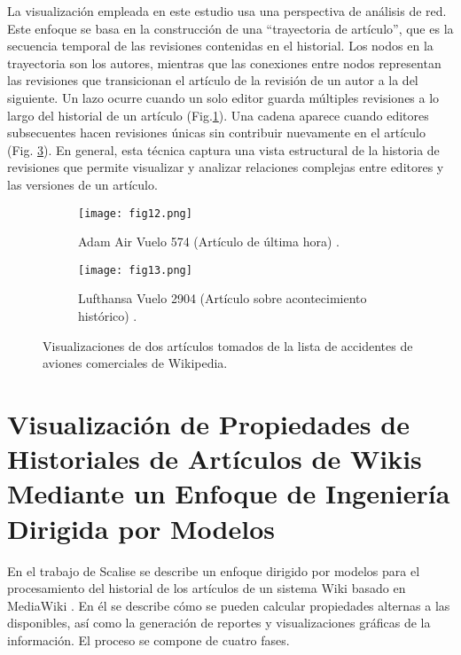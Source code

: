 La visualización empleada en este estudio usa una perspectiva de análisis de red. Este enfoque se basa en la construcción de una “trayectoria de artículo”, que es la secuencia temporal de las revisiones contenidas en el historial. Los nodos en la trayectoria son los autores, mientras que las conexiones entre nodos representan las revisiones que transicionan el artículo de la revisión de un autor a la del siguiente. Un lazo ocurre cuando un solo editor guarda múltiples revisiones a lo largo del historial de un artículo (Fig.\ref{fig:fig12}). Una cadena aparece cuando editores subsecuentes hacen revisiones únicas sin contribuir nuevamente en el artículo (Fig. \ref{fig:fig13}). En general, esta técnica captura una vista estructural de la historia de revisiones que permite visualizar y analizar relaciones complejas entre editores y las versiones de un artículo.

\begin{figure}[htp]
  \begin{subfigure}[b]{0.5\textwidth}
    \centering
    \texttt{[image: fig12.png]}
    \caption[]{Adam Air Vuelo 574 (Artículo de última hora) \cite[Fig. 2a]{Kee12}.}
    \label{fig:fig12}
  \end{subfigure}
  \hfill
  \begin{subfigure}[b]{0.45\textwidth}
    \centering
    \texttt{[image: fig13.png]}
    \caption[]{Lufthansa Vuelo 2904 (Artículo sobre acontecimiento histórico) \cite[Fig. 2d]{Kee12}.}
    \label{fig:fig13}
  \end{subfigure}
  \caption[Visualizaciones de dos artículos tomados de la lista de accidentes de aviones comerciales de Wikipedia]{Visualizaciones de dos artículos tomados de la lista de accidentes de aviones comerciales de Wikipedia.}
\end{figure}

\section{Visualización de Propiedades de Historiales de Artículos de Wikis Mediante un Enfoque de Ingeniería Dirigida por Modelos}
En el trabajo de Scalise se describe un enfoque dirigido por modelos para el procesamiento del historial de los artículos de un sistema Wiki basado en MediaWiki \cite{Sca08}. En él se describe cómo se pueden calcular propiedades alternas a las disponibles, así como la generación de reportes y visualizaciones gráficas de la información. El proceso se compone de cuatro fases.

